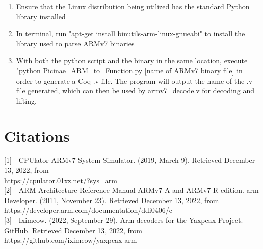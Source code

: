 \documentclass[twocolumn]{article}
\begin{document}
\begin{enumerate}
	\item Ensure that the Linux distribution being utilized has the standard Python library installed
	\item In terminal, run "apt-get install binutils-arm-linux-gnueabi" to install the library used to parse ARMv7 binaries
	\item With both the python script and the binary in the same location, execute "python Picinae\_ARM\_to\_Function.py [name of ARMv7 binary file] in order to generate a Coq .v file. The program will output the name of the .v file generated, which can then be used by armv7\_decode.v for decoding and lifting.
\end{enumerate}


\section*{\centering Citations}
\vspace{0.3cm}

[1] - CPUlator ARMv7 System Simulator. (2019, March 9). Retrieved December 13, 2022, from \\https://cpulator.01xz.net/?sys=arm\\

[2] - ARM Architecture Reference Manual ARMv7-A and ARMv7-R edition. arm Developer. (2011, November 23). Retrieved December 13, 2022, from https://developer.arm.com/documentation/ddi0406/c\\

[3] - Iximeow. (2022, September 29). Arm decoders for the Yaxpeax Project. GitHub. Retrieved December 13, 2022, from https://github.com/iximeow/yaxpeax-arm
\end{document}
